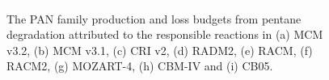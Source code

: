 \begin{figure}
    \begin{center}
        \includegraphics[width=\textwidth]{img/pentane_pan_budget_reactions}
        \caption{The PAN family production and loss budgets from pentane degradation attributed to the responsible reactions in (a) MCM v3.2, (b) MCM v3.1, (c) CRI v2, (d) RADM2, (e) RACM, (f) RACM2, (g) MOZART-4, (h) CBM-IV and (i) CB05.}
        \label{f:pentane_PAN}
    \end{center}
\end{figure} 


